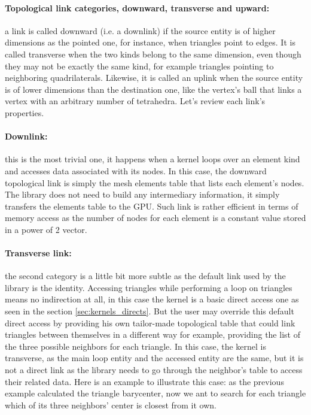 \documentclass[a4paper,12pt]{article}
\begin{document}
\paragraph{Topological link categories, downward, transverse and upward:} a link is called downward (i.e. a downlink) if the source entity is of higher dimensions as the pointed one, for instance, when triangles point to edges. It is called transverse when the two kinds belong to the same dimension, even though they may not be exactly the same kind, for example triangles pointing to neighboring quadrilaterals. Likewise, it is called an uplink when the source entity is of lower dimensions than the destination one, like the vertex's ball that links a vertex with an arbitrary number of tetrahedra. Let's review each link's properties.

\paragraph{Downlink:} this is the most trivial one, it happens when a kernel loops over an element kind and accesses data associated with its nodes. In this case, the downward topological link is simply the mesh elements table that lists each element's nodes. The library does not need to build any intermediary information, it simply transfers the elements table to the GPU. Such link is rather efficient in terms of memory access as the number of nodes for each element is a constant value stored in a power of 2 vector.

\paragraph{Transverse link:} the second category is a little bit more subtle as the default link used by the library is the identity. Accessing triangles while performing a loop on triangles means no indirection at all, in this case the kernel is a basic direct access one as seen in the section \ref{sec:kernels_directs}. But the user may override this default direct access by providing his own tailor-made topological table that could link triangles between themselves in a different way for example, providing the list of the three possible neighbors for each triangle. In this case, the kernel is transverse, as the main loop entity and the accessed entity are the same, but it is not a direct link as the library needs to go through the neighbor’s table to access their related data. Here is an example to illustrate this case: as the previous example calculated the triangle barycenter, now we ant to search for each triangle which of its three neighbors' center is closest from it own.
\end{document}
